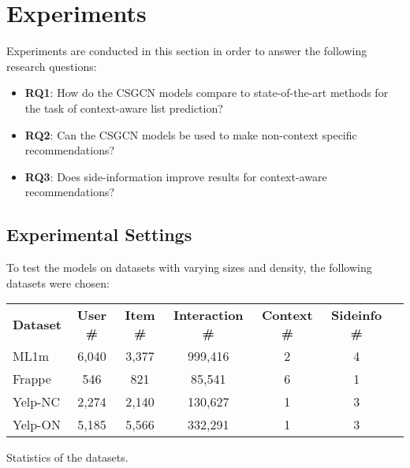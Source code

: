 \section{Experiments}\label{sec:experiments}
Experiments are conducted in this section in order to answer the following research questions:
\begin{itemize}
    \item \textbf{RQ1}: How do the CSGCN models compare to state-of-the-art methods for the task of context-aware list prediction?
    \item \textbf{RQ2}: Can the CSGCN models be used to make non-context specific recommendations?
    \item \textbf{RQ3}: Does side-information improve results for context-aware recommendations?
\end{itemize}

\subsection{Experimental Settings}\label{subsec:experimental-settings}
To test the models on datasets with varying sizes and density, the following datasets were chosen:\\

\begin{adjustwidth}{-2.5 cm}{-2.5 cm}\centering
\begin{threeparttable}[]
\scriptsize
\begin{tabular}{lcccccc}\toprule
\textbf{Dataset} &\textbf{User \#} &\textbf{Item \#} &\textbf{Interaction \#} &\textbf{Context \#} &\textbf{Sideinfo \#} \\\cmidrule{1-6}
ML1m &6,040 &3,377 &999,416 &2 &4 \\\cmidrule{1-6}
Frappe &546 & 821 &85,541 &6 &1 \\\cmidrule{1-6}
Yelp-NC &2,274 &2,140 &130,627 &1 &3 \\\cmidrule{1-6}
Yelp-ON &5,185 &5,566 &332,291 &1 &3 \\\midrule
\bottomrule
\end{tabular}
\caption{Statistics of the datasets.}\label{tab:datasetstats}
\end{threeparttable}
\end{adjustwidth}


